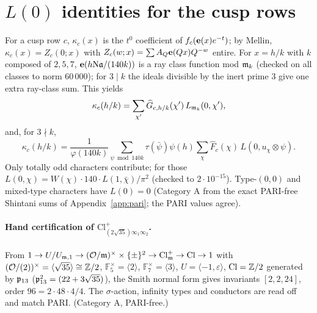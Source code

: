 
\section{$L(0)$ identities for the cusp rows}\label{sec:L0}
For a cusp row $c$, $\kappa_c(x)$ is the $t^0$ coefficient of $f_c(\mathbf{e}(x)e^{-t})$; by Mellin, $\kappa_c(x)=Z_c(0;x)$ with $Z_c(w;x)=\sum A_Q\mathbf{e}(Qx)Q^{-w}$ entire.
For $x=h/k$ with $k$ composed of $2,5,7$, $\mathbf{e}(h\mathrm{N}\mathfrak{a}/(140k))$ is a ray class function mod $\mathfrak{m}_k$ (checked on all classes to norm $60\,000$); for $3\mid k$ the
ideals divisible by the inert prime $3$ give one extra ray-class sum. This yields
\[
\kappa_c(h/k)=\sum_{\chi'}\widehat G_{c,h/k}(\chi')\,L_{\mathfrak{m}_k}(0,\chi'),\]
and, for $3\nmid k$,
\[
\kappa_c(h/k)=\frac1{\varphi(140k)}\sum_{\psi\bmod140k}\tau(\bar\psi)\psi(h)\sum_\chi\widehat F_c(\chi)\,L(0,u_\chi\otimes\psi).
\]
Only totally odd characters contribute; for those $L(0,\chi)=W(\chi)\cdot140\cdot L(1,\bar\chi)/\pi^2$ (checked to $2\cdot10^{-15}$). Type-$(0,0)$ and mixed-type
characters have $L(0)=0$ (Category A from the exact PARI-free Shintani sums of Appendix~\ref{app:pari}; the PARI values agree).

\paragraph{Hand certification of $\mathrm{Cl}^+_{(2\sqrt{35})\infty_1\infty_2}$.} From
$1\to U/U_{\mathfrak{m},1}\to(\mathcal{O}/\mathfrak{m})^\times\times\{\pm\}^2\to\mathrm{Cl}^+_{\mathfrak{m}}\to\mathrm{Cl}\to1$ with $(\mathcal{O}/(2))^\times=\langle\sqrt{35}\rangle\cong\mathbb{Z}/2$,
$\mathbb F_5^\times=\langle2\rangle$, $\mathbb F_7^\times=\langle3\rangle$, $U=\langle-1,\varepsilon\rangle$, $\mathrm{Cl}=\mathbb{Z}/2$ generated by $\mathfrak{p}_{13}$
($\mathfrak{p}_{13}^2=(22+3\sqrt{35})$), the Smith normal form gives invariants $[2,2,24]$, order $96=2\cdot48\cdot4/4$. The $\sigma$-action, infinity types and conductors
are read off and match PARI. (Category A, PARI-free.)

